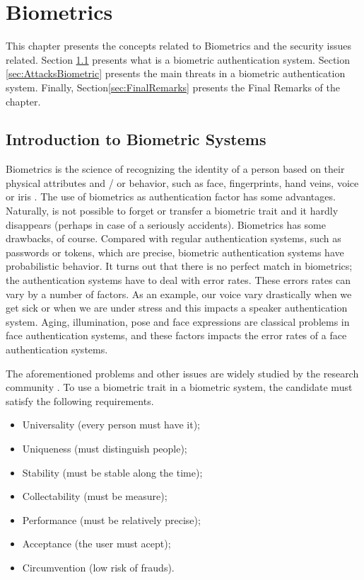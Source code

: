 \chapter{Biometrics}
\label{chap:Biometrics}

This chapter presents the concepts related to Biometrics and the security issues related. Section \ref{sec:IntroBiome} presents what is a biometric authentication system. Section \ref{sec:AttacksBiometric} presents the main threats in a biometric authentication system. Finally, Section\ref{sec:FinalRemarks} presents the Final Remarks of the chapter.

\section{Introduction to Biometric Systems}
\label{sec:IntroBiome}

Biometrics is the science of recognizing the identity of a person based on their physical attributes and / or behavior, such as face, fingerprints, hand veins, voice or iris \cite{li2011handbook}. The use of biometrics as authentication factor has some advantages. Naturally, is not possible to forget or transfer a biometric trait and it hardly disappears (perhaps in case of a seriously accidents). Biometrics has some drawbacks, of course. Compared with regular authentication systems, such as passwords or tokens, which are precise, biometric authentication systems have probabilistic behavior. It turns out that there is no perfect match in biometrics; the authentication systems have to deal with error rates. These errors rates can vary by a number of factors. As an example, our voice vary drastically  when we get sick or when we are under stress and this impacts a speaker authentication system. Aging, illumination, pose and face expressions are classical problems in face authentication systems, and these factors impacts the error rates of a face authentication systems. 

The aforementioned problems and other issues are widely studied by the research community \cite{flynn2008handbook}. To use a biometric trait in a biometric system, the candidate must satisfy the following requirements.

\begin{itemize}
        \item Universality (every person must have it);
        \item Uniqueness (must distinguish people);
        \item Stability (must be stable along the time);
        \item Collectability (must be measure);
        \item Performance (must be relatively precise);
        \item Acceptance (the user must acept);
        \item Circumvention (low risk of frauds).
\end{itemize}

